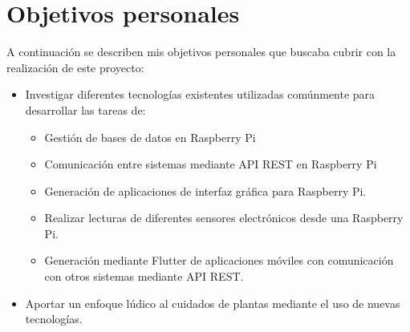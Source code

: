 \section{Objetivos personales}
A continuación se describen mis objetivos personales que buscaba cubrir con la realización de este proyecto:
\begin{itemize}
    \item Investigar diferentes tecnologías existentes utilizadas comúnmente para desarrollar las tareas de:
    \begin{itemize}
        \item Gestión de bases de datos en Raspberry Pi
        \item Comunicación entre sistemas mediante API REST en Raspberry Pi
        \item Generación de aplicaciones de interfaz gráfica para Raspberry Pi.
        \item Realizar lecturas de diferentes sensores electrónicos desde una Raspberry Pi.   
        \item Generación mediante Flutter de aplicaciones móviles con comunicación con otros sistemas mediante API REST.
    \end{itemize}
    \item Aportar un enfoque lúdico al cuidados de plantas mediante el uso de nuevas tecnologías.
\end{itemize}